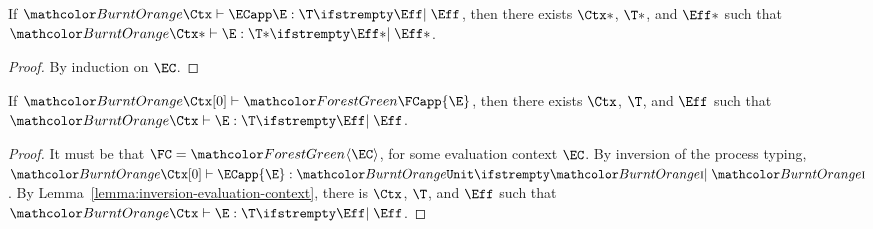 \documentclass[acmsmall,screen,review,anonymous,nonacm]{acmart}
\begin{document}
\begin{lemma}
  \label{lemma:inversion-evaluation-context}
  If $\HasType[\Eff]{\Ctx}{\ECapp\E}{\T}$, then there exists $\Ctx*$,
  $\T*$, and $\Eff*$ such that $\HasType[\Eff*]{\Ctx*}{\E}{\T*}$.
\end{lemma}
\begin{proof}
  By induction on $\EC$.
\end{proof}

\begin{lemma}
  \label{lemma:inversion-process-evaluation-context}
  If $\ProcHasType{\Ctx[0]} {\FCapp{\E}}$, then there exists $\Ctx$,
  $\T$, and $\Eff$ such that $\HasType[\Eff]{\Ctx}{\E}{\T}$.
\end{lemma}
\begin{proof}
  It must be that $\FC = \PExp \EC$, for some evaluation context $\EC$.
  By inversion of the process typing,
  $\HasType[\EffImpure]{\Ctx[0]}{\ECapp{\E}}{\BUnit}$.
  By Lemma~\ref{lemma:inversion-evaluation-context}, there is  $\Ctx$,
  $\T$, and $\Eff$ such that $\HasType[\Eff]{\Ctx}{\E}{\T}$.
\end{proof}
\end{document}
